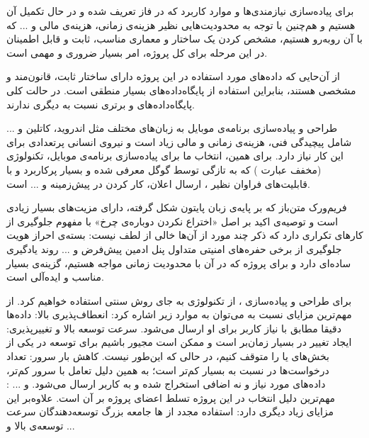 
برای پیاده‌سازی نیازمندی‌ها و موارد کاربرد  که در فاز  تعریف شده و در حال تکمیل آن هستیم و هم‌چنین با توجه به محدودیت‌هایی نظیر هزینه‌ی زمانی، هزینه‌ی مالی و ... که با آن روبه‌رو هستیم، مشخص کردن یک ساختار و معماری مناسب، ثابت و قابل اطمینان در این مرحله برای کل پروژه، امر بسیار ضروری و مهمی است.


	  از آن‌حایی که داده‌های مورد استفاده در این پروژه دارای ساختار ثابت، قانون‌مند و مشخصی هستند، بنابراین استفاده از پایگاه‌داده‌های  بسیار منطقی است. در حالت کلی پایگاه‌داده‌های  و  برتری نسبت به دیگری ندارند.
	
	  طراحی و پیاده‌سازی برنامه‌ی موبایل به زبان‌های مختلف مثل اندروید، کاتلین و ... شامل پیچیدگی فنی، هزینه‌ی زمانی و مالی زیاد است و نیروی انسانی پرتعدادی برای این کار نیاز دارد. برای همین، انتخاب ما برای پیاده‌سازی برنامه‌ی موبایل، تکنولوژی  (مخفف عبارت ) که به تازگی توسط گوگل معرفی شده و بسیار پرکاربرد و با قابلیت‌های فراوان نظیر ، ارسال اعلان، کار کردن در پیش‌زمینه و ... است.
	
	  فریم‌ورک متن‌باز  که بر پایه‌ی زبان پایتون شکل گرفته، دارای مزیت‌های بسیار زیادی است  و توصیه‌ی اکید بر اصل «اختراع نکردن دوباره‌ی چرخ» با مفهوم جلوگیری از کارهای تکراری دارد که ذکر چند مورد از آن‌ها خالی از لطف نیست:
		 بسته‌ی احراز هویت
		 جلوگیری از برخی حفره‌های امنیتی متداول
		 پنل ادمین پیش‌فرض
		 و ...
	روند یادگیری ساده‌ای دارد و برای پروژه که در آن با محدودیت زمانی مواجه هستیم، گزینه‌ی بسیار مناسب و ایده‌آلی است.
	
	برای طراحی و پیاده‌سازی ، از تکنولوژی  به جای روش سنتی  استفاده خواهیم کرد. از مهم‌ترین مزایای  نسبت به  می‌توان به موارد زیر اشاره کرد:
		 انعطاف‌پذیری بالا: داده‌ها دقیقا مطابق با نیاز کاربر برای او ارسال می‌شود.
		 سرعت توسعه بالا و تغییرپذیری: ایجاد تغییر در  بسیار زمان‌بر است و ممکن است مجیور باشیم برای توسعه در یکی از بخش‌های  یا  را متوقف کنیم، در حالی که  این‌طور نیست.
		 کاهش بار سرور: تعداد درخواست‌ها در  نسبت به  بسیار کم‌تر است؛ به همین دلیل تعامل با سرور کم‌تر، داده‌های مورد نیاز و نه اضافی استخراج شده و به کاربر ارسال می‌شود.
		 و ...
	 : مهم‌ترین دلیل انتخاب  در این پروژه تسلط اعضای پروژه بر آن است. علاوه‌بر این  مزایای زیاد دیگری دارد:
		 استفاده مجدد از ها
		 جامعه بزرگ توسعه‌دهندگان
		 سرعت توسعه‌ی بالا
		 و ...
